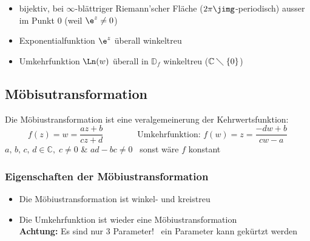 \begin{itemize}
    \item bijektiv, bei $\infty$-blättriger Riemann'scher Fläche ($2 \pi \jimg$-periodisch) ausser im Punkt $0$ (weil $\e^z \neq 0$)
    \item Exponentialfunktion $\e^z$ überall winkeltreu
    \item Umkehrfunktion $\Ln(w)$ überall in $\mathbb{D}_f$ winkeltreu ($\mathbb{C} \: \diagdown \; \lbrace 0 \rbrace$)
\end{itemize}


\subsection{Möbisutransformation}

Die Möbiustransformation ist eine veralgemeinerung der Kehrwertsfunktion:
$$ f(z) = w = \frac{az + b}{cz + d} \qquad \qquad \text{Umkehrfunktion: } f(w) = z =\frac{-dw + b}{cw - a} $$
$a, \, b, \, c, \, d \in \mathbb{C}, \; c \neq0$ \& $ad - bc\neq 0$ \textrightarrow\ sonst wäre $f$ konstant


\smallskip

%


\subsubsection{Eigenschaften der Möbiustransformation}

\begin{itemize}
    \item Die Möbiustransformation ist winkel- und kreistreu
    \item Die Umkehrfunktion ist wieder eine Möbiustransformation \\
        \textbf{Achtung:} Es sind nur 3 Parameter! \textrightarrow\ ein Parameter kann gekürtzt werden
\end{itemize}


